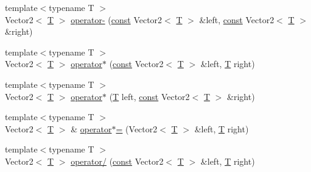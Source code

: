 \begin{DoxyCompactItemize}
\item 
{\footnotesize template$<$typename T $>$ }\\Vector2$<$ \hyperlink{curses_8priv_8h_a5ef253115820acf7d27f3c5c3b02a0f0}{T} $>$ \hyperlink{lapin_2dep_2_s_f_m_l-2_83_2include_2_s_f_m_l_2_system_2_vector2_8inl_ad844643fc6fb0eea05a382b318ae5259}{operator-\/} (\hyperlink{term__entry_8h_a57bd63ce7f9a353488880e3de6692d5a}{const} Vector2$<$ \hyperlink{curses_8priv_8h_a5ef253115820acf7d27f3c5c3b02a0f0}{T} $>$ \&left, \hyperlink{term__entry_8h_a57bd63ce7f9a353488880e3de6692d5a}{const} Vector2$<$ \hyperlink{curses_8priv_8h_a5ef253115820acf7d27f3c5c3b02a0f0}{T} $>$ \&right)
\item 
{\footnotesize template$<$typename T $>$ }\\Vector2$<$ \hyperlink{curses_8priv_8h_a5ef253115820acf7d27f3c5c3b02a0f0}{T} $>$ \hyperlink{lapin_2dep_2_s_f_m_l-2_83_2include_2_s_f_m_l_2_system_2_vector2_8inl_a4bcfa0548660237aec2f1fdfd000a30f}{operator$\ast$} (\hyperlink{term__entry_8h_a57bd63ce7f9a353488880e3de6692d5a}{const} Vector2$<$ \hyperlink{curses_8priv_8h_a5ef253115820acf7d27f3c5c3b02a0f0}{T} $>$ \&left, \hyperlink{curses_8priv_8h_a5ef253115820acf7d27f3c5c3b02a0f0}{T} right)
\item 
{\footnotesize template$<$typename T $>$ }\\Vector2$<$ \hyperlink{curses_8priv_8h_a5ef253115820acf7d27f3c5c3b02a0f0}{T} $>$ \hyperlink{lapin_2dep_2_s_f_m_l-2_83_2include_2_s_f_m_l_2_system_2_vector2_8inl_afe4ec033f7e7061b5693a7dbcdecf96e}{operator$\ast$} (\hyperlink{curses_8priv_8h_a5ef253115820acf7d27f3c5c3b02a0f0}{T} left, \hyperlink{term__entry_8h_a57bd63ce7f9a353488880e3de6692d5a}{const} Vector2$<$ \hyperlink{curses_8priv_8h_a5ef253115820acf7d27f3c5c3b02a0f0}{T} $>$ \&right)
\item 
{\footnotesize template$<$typename T $>$ }\\Vector2$<$ \hyperlink{curses_8priv_8h_a5ef253115820acf7d27f3c5c3b02a0f0}{T} $>$ \& \hyperlink{lapin_2dep_2_s_f_m_l-2_83_2include_2_s_f_m_l_2_system_2_vector2_8inl_af8c6cb01ae7604914f9ea350793712bb}{operator$\ast$=} (Vector2$<$ \hyperlink{curses_8priv_8h_a5ef253115820acf7d27f3c5c3b02a0f0}{T} $>$ \&left, \hyperlink{curses_8priv_8h_a5ef253115820acf7d27f3c5c3b02a0f0}{T} right)
\item 
{\footnotesize template$<$typename T $>$ }\\Vector2$<$ \hyperlink{curses_8priv_8h_a5ef253115820acf7d27f3c5c3b02a0f0}{T} $>$ \hyperlink{lapin_2dep_2_s_f_m_l-2_83_2include_2_s_f_m_l_2_system_2_vector2_8inl_a1a55a08f8d786e49995d2b162d0ef922}{operator/} (\hyperlink{term__entry_8h_a57bd63ce7f9a353488880e3de6692d5a}{const} Vector2$<$ \hyperlink{curses_8priv_8h_a5ef253115820acf7d27f3c5c3b02a0f0}{T} $>$ \&left, \hyperlink{curses_8priv_8h_a5ef253115820acf7d27f3c5c3b02a0f0}{T} right)

\end{DoxyCompactItemize}
